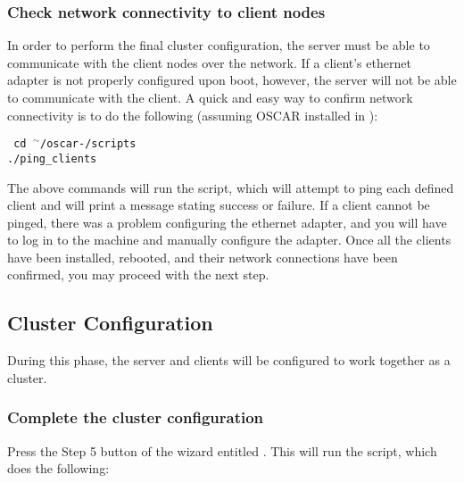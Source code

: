 \subsubsection{Check network connectivity to client nodes}
\label{det:pingclients}

In order to perform the final cluster configuration, the server must
be able to communicate with the client nodes over the network. If a
client's ethernet adapter is not properly configured upon boot,
however, the server will not be able to communicate with the client. A
quick and easy way to confirm network connectivity is to do the
following (assuming OSCAR installed in ):

\vspace{11pt}
{\tt
  cd $^\sim$/oscar-\oscarversion/scripts \\
\indent  ./ping\_clients
}
\vspace{11pt}

The above commands will run the  script, which will
attempt to ping each defined client and will print a message stating
success or failure. If a client cannot be pinged, there was a problem
configuring the ethernet adapter, and you will have to log in to the
machine and manually configure the adapter. Once all the clients have
been installed, rebooted, and their network connections have been
confirmed, you may proceed with the next step.


\subsection{Cluster Configuration}

During this phase, the server and clients will be configured to work
together as a cluster.

\subsubsection{Complete the cluster configuration}
\label{det:completeinstall}

Press the Step 5 button of the wizard entitled .  This will run the  script,
which does the following:

